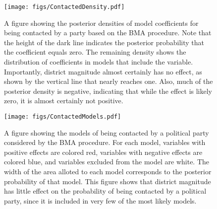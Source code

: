 \documentclass[12pt]{article}
\begin{document}


%
\newpage
\begin{figure}[h]
\texttt{[image: figs/ContactedDensity.pdf]}
\caption{A figure showing the posterior densities of model coefficients for being contacted by a party based on the BMA procedure. Note that the height of the dark line indicates the posterior probability that the coefficient equals zero. The remaining density shows the distribution of coefficients in models that include the variable. Importantly, district magnitude almost certainly has no effect, as shown by the vertical line that nearly reaches one. Also, much of the posterior density is negative, indicating that while the effect is likely zero, it is almost certainly not positive.}\label{fig:ContactedDensity}
\end{figure}

\newpage
\begin{figure}[h]
\texttt{[image: figs/ContactedModels.pdf]}
\caption{A figure showing the models of being contacted by a political party considered by the BMA procedure. For each model, variables with positive effects are colored red, variables with negative effects are colored blue, and variables excluded from the model are white. The width of the area alloted to each model corresponds to the posterior probability of that model. This figure shows that district magnitude has little effect on the probability of being contacted by a political party, since it is included in very few of the most likely models.}\label{fig:ContactedModels}
\end{figure}
\end{document}
